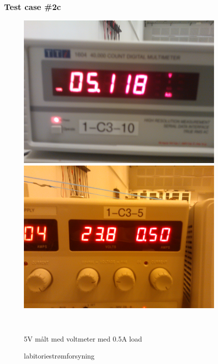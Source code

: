 \subsubsection{Test case \#2c}
\begin{figure}[htbp] \centering
\begin{minipage}[c]{0.48\textwidth} \centering
\includegraphics[width=0.9\textwidth]{billeder/5V_05A_meter.jpg} 
\end{minipage} \hfill
\begin{minipage}[c]{0.48\textwidth} \centering
\includegraphics[width=0.9\textwidth]{billeder/5V_05A_power.jpg} 
\end{minipage} \\ 
\begin{minipage}[b]{0.48\textwidth}
\caption{5V målt med voltmeter med 0.5A load} 
\label{fig:udgang_5V_05A}
\end{minipage} \hfill
\begin{minipage}[b]{0.48\textwidth}
\caption{labitoriestrømforsyning} 
\label{fig:forsyning_5V_05A_lab}
\end{minipage}
\end{figure}
\newpage
